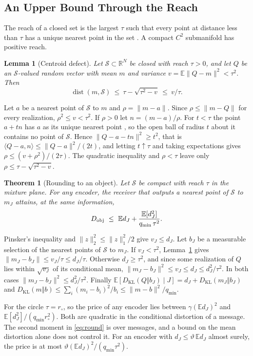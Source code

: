 \documentclass[10pt,journal]{IEEEtran}
\newtheorem{theorem}{Theorem}
\newtheorem{lemma}{Lemma}
\newcommand{\E}{\mathbb E}
\newcommand{\Sset}{\mathcal S}
\newcommand{\KL}{D_{\mathrm{KL}}}
\DeclareMathOperator{\dist}{dist}
\begin{document}
\subsection{An Upper Bound Through the Reach}
The reach of a closed set is the largest $\tau$ such that every point at distance less than $\tau$ has a unique nearest point in the set \cite{federer1959curvature}. A compact $C^2$ submanifold has positive reach.
\begin{lemma}[Centroid defect]\label{lem:defect}
Let $\Sset\subset\mathbb R^N$ be closed with reach $\tau>0$, and let $Q$ be an $\Sset$-valued random vector with mean $m$ and variance $v=\E\|Q-m\|^2<\tau^2$. Then
\begin{equation}
 \dist(m,\Sset)\ \le\ \tau-\sqrt{\tau^2-v}\ \le\ v/\tau .
\end{equation}
\end{lemma}
\begin{IEEEproof}
Let $a$ be a nearest point of $\Sset$ to $m$ and $\rho=\|m-a\|$. Since $\rho\le\|m-Q\|$ for every realization, $\rho^2\le v<\tau^2$. If $\rho>0$ let $n=(m-a)/\rho$. For $t<\tau$ the point $a+tn$ has $a$ as its unique nearest point \cite[Th.~4.8]{federer1959curvature}, so the open ball of radius $t$ about it contains no point of $\Sset$. Hence $\|Q-a-tn\|^2\ge t^2$, that is $\langle Q-a,n\rangle\le\|Q-a\|^2/(2t)$, and letting $t\uparrow\tau$ and taking expectations gives $\rho\le(v+\rho^2)/(2\tau)$. The quadratic inequality and $\rho<\tau$ leave only $\rho\le\tau-\sqrt{\tau^2-v}$.
\end{IEEEproof}
\begin{theorem}[Rounding to an object]\label{thm:reach}
Let $\Sset$ be compact with reach $\tau$ in the mixture plane. For any encoder, the receiver that outputs a nearest point of $\Sset$ to $m_J$ attains, at the same information,
\begin{equation}
 D_{\rm obj}\ \le\ \E d_J+\frac{\E[d_J^2]}{{q_{\min}}\,\tau^2}. \label{eq:round}
\end{equation}
\end{theorem}
\begin{IEEEproof}
Pinsker's inequality and $\|z\|_2^2\le\|z\|_1^2/2$ give $v_J\le d_J$. Let $b_J$ be a measurable selection of the nearest points of $\Sset$ to $m_J$. If $v_J<\tau^2$, Lemma~\ref{lem:defect} gives $\|m_J-b_J\|\le v_J/\tau\le d_J/\tau$. Otherwise $d_J\ge\tau^2$, and since some realization of $Q$ lies within $\sqrt{v_J}$ of its conditional mean, $\|m_J-b_J\|^2\le v_J\le d_J\le d_J^2/\tau^2$. In both cases $\|m_J-b_J\|^2\le d_J^2/\tau^2$. Finally $\E[\KL(Q\Vert b_J)\mid J]=d_J+\KL(m_J\Vert b_J)$ and $\KL(m\Vert b)\le\sum_i(m_i-b_i)^2/b_i\le\|m-b\|^2/{q_{\min}}$.
\end{IEEEproof}
For the circle $\tau=r_\circ$, so the price of any encoder lies between $\gamma(\E d_J)^2$ and $\E[d_J^2]/({q_{\min}} r_\circ^2)$. Both are quadratic in the conditional distortion of a message. The second moment in \eqref{eq:round} is over messages, and a bound on the mean distortion alone does not control it. For an encoder with $d_J\le\vartheta\,\E d_J$ almost surely, the price is at most $\vartheta(\E d_J)^2/({q_{\min}}\tau^2)$.
\end{document}
